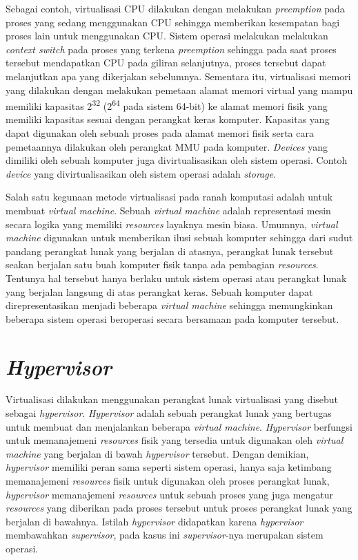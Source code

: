 Sebagai contoh, virtualisasi CPU dilakukan dengan melakukan \textit{preemption} pada proses yang
sedang menggunakan CPU sehingga memberikan kesempatan bagi proses lain untuk menggunakan CPU.
Sistem operasi melakukan melakukan \textit{context switch} pada proses yang terkena
\textit{preemption} sehingga pada saat proses tersebut mendapatkan CPU pada giliran selanjutnya,
proses tersebut dapat melanjutkan apa yang dikerjakan sebelumnya.  Sementara itu, virtualisasi
memori yang dilakukan dengan melakukan pemetaan alamat memori virtual yang mampu memiliki
kapasitas 2\textsuperscript{32} (2\textsuperscript{64} pada sistem 64-bit) ke alamat memori
fisik yang memiliki kapasitas sesuai dengan perangkat keras komputer.  Kapasitas yang dapat
digunakan oleh sebuah proses pada alamat memori fisik serta cara pemetaannya dilakukan oleh
perangkat MMU pada komputer.  \textit{Devices} yang dimiliki oleh sebuah komputer juga
divirtualisasikan oleh sistem operasi.  Contoh \textit{device} yang divirtualisasikan oleh
sistem operasi adalah \textit{storage}.

Salah satu kegunaan metode virtualisasi pada ranah komputasi adalah untuk membuat
\textit{virtual machine}.  Sebuah \textit{virtual machine} adalah representasi mesin secara
logika yang memiliki \textit{resources} layaknya mesin biasa.  Umumnya, \textit{virtual machine}
digunakan untuk memberikan ilusi sebuah komputer sehingga dari sudut pandang perangkat lunak
yang berjalan di atasnya, perangkat lunak tersebut seakan berjalan satu buah komputer fisik
tanpa ada pembagian \textit{resources}.  Tentunya hal tersebut hanya berlaku untuk sistem
operasi atau perangkat lunak yang berjalan langsung di atas perangkat keras.  Sebuah komputer
dapat direpresentasikan menjadi beberapa \textit{virtual machine} sehingga memungkinkan beberapa
sistem operasi beroperasi secara bersamaan pada komputer tersebut.

\section{\textit{Hypervisor}}

Virtualisasi dilakukan menggunakan perangkat lunak virtualisasi yang disebut sebagai
\textit{hypervisor}.  \textit{Hypervisor} adalah sebuah perangkat lunak yang bertugas untuk
membuat dan menjalankan beberapa \textit{virtual machine}.  \textit{Hypervisor} berfungsi untuk
memanajemeni \textit{resources} fisik yang tersedia untuk digunakan oleh \textit{virtual
machine} yang berjalan di bawah \textit{hypervisor} tersebut.  Dengan demikian,
\textit{hypervisor} memiliki peran sama seperti sistem operasi, hanya saja ketimbang
memanajemeni \textit{resources} fisik untuk digunakan oleh proses perangkat lunak,
\textit{hypervisor} memanajemeni \textit{resources} untuk sebuah proses yang juga mengatur
\textit{resources} yang diberikan pada proses tersebut untuk proses perangkat lunak yang
berjalan di bawahnya.  Istilah \textit{hypervisor} didapatkan karena \textit{hypervisor}
membawahkan \textit{supervisor}, pada kasus ini \textit{supervisor}-nya merupakan sistem
operasi.

